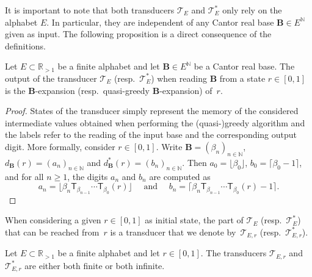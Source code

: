 \documentclass[12pt,reqno]{amsart}
\newcommand\emilie[1]{\mbox{}
{\marginpar{\color{orange}E}}
{\sf\noindent\color{orange}[#1]}}
\newcommand{\B}{{\mathbf{B}}}
\begin{document}

It is important to note that both transducers $\mathcal{T}_E$ and $\mathcal{T}^*_E$ only rely on the alphabet $E$. In particular, they are independent of any Cantor real base $\B\in E^{\mathbb{N}}$ given as input. The following proposition is a direct consequence of the definitions. 

\begin{proposition}
Let $E\subset \mathbb{R}_{>1}$ be a finite alphabet and let $\B \in E^{\mathbb{N}}$ be a Cantor real base. The output of the transducer $\mathcal{T}_E$ (resp.\ $\mathcal{T}^*_E$) when reading $\B$ from a state $r\in [0,1]$ is the $\B$-expansion (resp.\ quasi-greedy $\B$-expansion) of~$r$.
\end{proposition}

\begin{proof}
    States of the transducer simply represent the memory of the considered intermediate values obtained when performing the (quasi-)greedy algorithm and the labels refer to the reading of the input base and the corresponding output digit. More formally, consider $r\in[0,1]$. Write $\B=(\beta_n)_{n\in\mathbb{N}}$, $d_{\B}(r)=(a_n)_{n\in\mathbb{N}}$ and $d^*_{\B}(r)=(b_n)_{n\in\mathbb{N}}$. Then $a_0=\lfloor \beta_0 \rfloor$, $b_0=\lceil \beta_0 -1 \rceil$, and for all $n\ge 1$, the digits $a_n$ and $b_n$ are computed as 
    \[
        a_n=\lfloor \beta_n\mathsf{T}_{\beta_{n-1}}\cdots\mathsf{T}_{\beta_0}(r)\rfloor\quad \text{ and }\quad
        b_n=\lceil  \beta_n\mathsf{T}_{\beta_{n-1}}\cdots\mathsf{T}_{\beta_0}(r)-1\rceil.
    \]
\end{proof}

\begin{definition}
  When considering a given $r\in [0,1]$ as initial state, the part of $\mathcal{T}_E$ (resp.\ $\mathcal{T}^*_E$) that can be reached from~$r$ is a transducer that we denote by~$\mathcal{T}_{E,r}$ (resp.~$\mathcal{T}^*_{E,r}$).
\end{definition}

\begin{proposition}
    \label{prop:TE-TE*-simultanement-finis}
    Let $E\subset \mathbb{R}_{>1}$ be a finite alphabet and let $r\in[0,1]$. The transducers $\mathcal{T}_{E,r}$ and $\mathcal{T}^*_{E,r}$ are either both finite or both infinite.
    \end{proposition}
\end{document}
